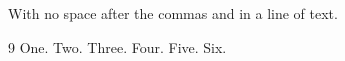 \documentclass{article}
\begin{document}
With no space after the commas \cite{a,c,e} and \cite{b,a,f,e,d} in a line of text.

\begin{thebibliography}{9}
 One.
 Two.
 Three.
 Four.
 Five.
 Six.
\end{thebibliography}
\end{document}

